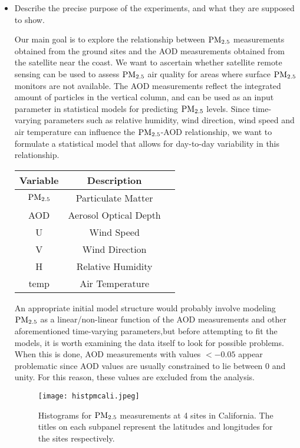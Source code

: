 \documentclass[10pt]{article}
\begin{document}
\begin{itemize}
\item Describe the precise purpose of the experiments, and what they 
are supposed to show.

Our main goal is to explore the relationship between ${\mathrm{PM_{2.5}}}$ measurements obtained from the ground sites and the AOD measurements obtained from the satellite near the coast. We want to ascertain whether satellite remote sensing can be used to assess ${\mathrm{PM_{2.5}}}$ air quality for areas where surface ${\mathrm{PM_{2.5}}}$  monitors are not available. The AOD measurements reflect the integrated amount of particles in the vertical column, and can be used as an input parameter in statistical models for predicting ${\mathrm{PM_{2.5}}}$ levels. Since time-varying parameters such as relative humidity, wind direction, wind speed and air temperature can influence the ${\mathrm{PM_{2.5}}}$-AOD relationship, we want to formulate a statistical model that allows for day-to-day variability in this relationship.  \\

\begin{table}[h] 
\centering
\begin{tabular}{|c|c|c|}
\hline
Variable & Description \\ 
\hline
${\mathrm{PM_{2.5}}}$ & Particulate Matter \\
AOD & Aerosol Optical Depth \\
U & Wind Speed \\
V & Wind Direction \\
H & Relative Humidity \\
temp & Air Temperature \\
\hline
\end{tabular}
\end{table}

An appropriate initial model structure would probably involve modeling ${\mathrm{PM_{2.5}}}$ as a linear/non-linear function of the AOD measurements and other aforementioned time-varying parameters,but before attempting to fit the models, it is worth examining the data itself to look for possible problems. When this is done, AOD measurements with values $< -0.05$ appear problematic since AOD values are usually constrained to lie between 0 and unity. For this reason, these values are excluded from the analysis. \\ 

\begin{figure}[h]
\centering
\texttt{[image: histpmcali.jpeg]}
\caption{Histograms for ${\mathrm{PM_{2.5}}}$ measurements at 4 sites in California. The titles on each subpanel represent the latitudes and longitudes for the sites respectively.}
\end{figure}


\end{itemize}
\end{document}
